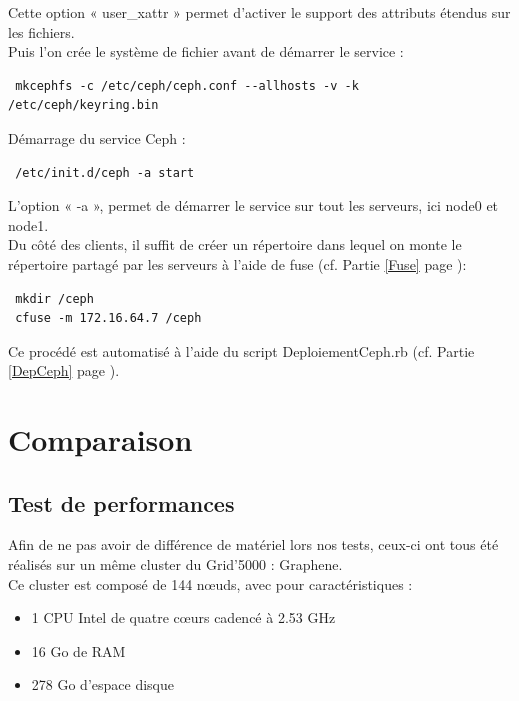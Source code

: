 \documentclass[12pt]{report}
\begin{document}
                        Cette option « user\_xattr » permet d'activer le support des attributs étendus sur les fichiers.\\
                        Puis l'on crée le système de fichier avant de démarrer le service :
                        \begin{lstlisting}
 mkcephfs -c /etc/ceph/ceph.conf --allhosts -v -k /etc/ceph/keyring.bin
                        \end{lstlisting}
                        Démarrage du service Ceph :
                        \begin{lstlisting}
 /etc/init.d/ceph -a start
                        \end{lstlisting}
                        L'option « -a », permet de démarrer le service sur tout les serveurs, ici node0 et node1.\\
                        
                        Du côté des clients, il suffit de créer un répertoire dans lequel on monte le répertoire partagé par les serveurs à l'aide de fuse (cf. Partie \ref{Fuse} page \pageref{Fuse}):
                        \begin{lstlisting}
 mkdir /ceph
 cfuse -m 172.16.64.7 /ceph
                        \end{lstlisting}
                        Ce procédé est automatisé à l'aide du script DeploiementCeph.rb (cf. Partie \ref{DepCeph} page \pageref{DepCeph}).
	\chapter{Comparaison}
		\section{Test de performances}
			Afin de ne pas avoir de différence de matériel lors nos tests, ceux-ci ont tous été réalisés sur un même cluster du Grid'5000 : Graphene.\\

			Ce cluster est composé de 144 nœuds, avec pour caractéristiques :
			\begin{itemize}
				\item 1 CPU Intel de quatre cœurs cadencé à 2.53 GHz
				\item 16 Go de RAM
				\item 278 Go d'espace disque\\
			\end{itemize}
\end{document}
